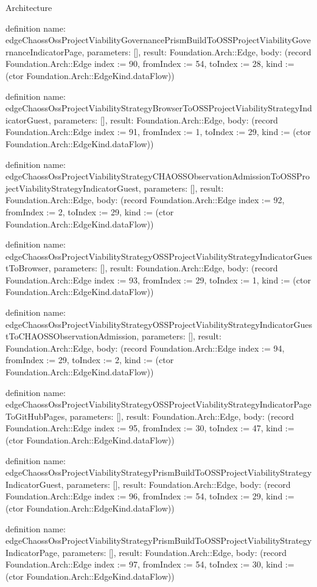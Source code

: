 \begin{lexlean}{Architecture}
\begin{semanticmodule}
definition{
  name: edgeChaossOssProjectViabilityGovernancePrismBuildToOSSProjectViabilityGovernanceIndicatorPage,
  parameters: [],
  result: Foundation.Arch::Edge,
  body: (record Foundation.Arch::Edge {index := 90, fromIndex := 54, toIndex := 28, kind := (ctor Foundation.Arch::EdgeKind.dataFlow)})
}

definition{
  name: edgeChaossOssProjectViabilityStrategyBrowserToOSSProjectViabilityStrategyIndicatorGuest,
  parameters: [],
  result: Foundation.Arch::Edge,
  body: (record Foundation.Arch::Edge {index := 91, fromIndex := 1, toIndex := 29, kind := (ctor Foundation.Arch::EdgeKind.dataFlow)})
}

definition{
  name: edgeChaossOssProjectViabilityStrategyCHAOSSObservationAdmissionToOSSProjectViabilityStrategyIndicatorGuest,
  parameters: [],
  result: Foundation.Arch::Edge,
  body: (record Foundation.Arch::Edge {index := 92, fromIndex := 2, toIndex := 29, kind := (ctor Foundation.Arch::EdgeKind.dataFlow)})
}

definition{
  name: edgeChaossOssProjectViabilityStrategyOSSProjectViabilityStrategyIndicatorGuestToBrowser,
  parameters: [],
  result: Foundation.Arch::Edge,
  body: (record Foundation.Arch::Edge {index := 93, fromIndex := 29, toIndex := 1, kind := (ctor Foundation.Arch::EdgeKind.dataFlow)})
}

definition{
  name: edgeChaossOssProjectViabilityStrategyOSSProjectViabilityStrategyIndicatorGuestToCHAOSSObservationAdmission,
  parameters: [],
  result: Foundation.Arch::Edge,
  body: (record Foundation.Arch::Edge {index := 94, fromIndex := 29, toIndex := 2, kind := (ctor Foundation.Arch::EdgeKind.dataFlow)})
}

definition{
  name: edgeChaossOssProjectViabilityStrategyOSSProjectViabilityStrategyIndicatorPageToGitHubPages,
  parameters: [],
  result: Foundation.Arch::Edge,
  body: (record Foundation.Arch::Edge {index := 95, fromIndex := 30, toIndex := 47, kind := (ctor Foundation.Arch::EdgeKind.dataFlow)})
}

definition{
  name: edgeChaossOssProjectViabilityStrategyPrismBuildToOSSProjectViabilityStrategyIndicatorGuest,
  parameters: [],
  result: Foundation.Arch::Edge,
  body: (record Foundation.Arch::Edge {index := 96, fromIndex := 54, toIndex := 29, kind := (ctor Foundation.Arch::EdgeKind.dataFlow)})
}

definition{
  name: edgeChaossOssProjectViabilityStrategyPrismBuildToOSSProjectViabilityStrategyIndicatorPage,
  parameters: [],
  result: Foundation.Arch::Edge,
  body: (record Foundation.Arch::Edge {index := 97, fromIndex := 54, toIndex := 30, kind := (ctor Foundation.Arch::EdgeKind.dataFlow)})
}


\end{semanticmodule}
\end{lexlean}
